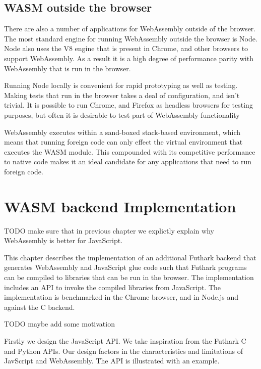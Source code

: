 \documentclass[11pt]{book}
\begin{document}
\section{WASM outside the browser}

There are also a number of applications for WebAssembly outside of the browser. The most standard engine for running WebAssembly outside the browser is Node. Node also uses the V8 engine that is present in Chrome, and other browsers to support WebAssembly. As a result it is a high degree of performance parity with WebAssembly that is run in the browser.

Running Node locally is convenient for rapid prototyping as well as testing. Making tests that run in the browser takes a deal of configuration, and isn't trivial. It is possible to run Chrome, and Firefox as headless browsers for testing purposes, but often it is desirable to test part of WebAssembly functionality


WebAssembly executes within a sand-boxed stack-based environment, which means that running foreign code can only effect the virtual environment that executes the WASM module. This compounded with its competitive performance to native code makes it an ideal candidate for any applications that need to run foreign code. 




\chapter{WASM backend Implementation}

TODO make sure that in previous chapter we explictly explain why WebAssembly is better for JavaScript. 



This chapter describes the implementation of an additional Futhark backend that generates WebAssembly and JavaScript glue code such that Futhark programs can be compiled to libraries that can be run in the browser. The implementation includes an API to invoke the compiled libraries from JavaScript. The implementation is benchmarked in the Chrome browser, and in Node.js and against the C backend.

TODO maybe add some motivation

Firstly we design the JavaScript API. We take inspiration from the Futhark C and Python APIs. Our design factors in the characteristics and limitations of JavScript and WebAssembly. The API is illustrated with an example.
\end{document}
